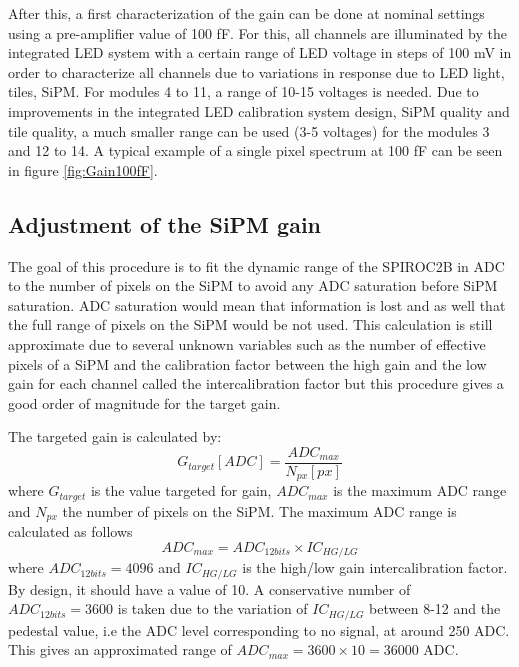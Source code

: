 After this, a first characterization of the gain can be done at nominal settings using a pre-amplifier value of 100 fF. For this, all channels are illuminated by the integrated LED system with a certain range of LED voltage in steps of 100 mV in order to characterize all channels due to variations in response due to LED light, tiles, SiPM. For modules 4 to 11, a range of 10-15 voltages is needed. Due to improvements in the integrated LED calibration system design, SiPM quality and tile quality, a much smaller range can be used (3-5 voltages) for the modules 3 and 12 to 14. A typical example of a single pixel spectrum at 100 fF can be seen in figure \ref{fig:Gain100fF}.

\subsection{Adjustment of the SiPM gain}
\label{sec:AdjustGain}

The goal of this procedure is to fit the dynamic range of the SPIROC2B in ADC to the number of pixels on the SiPM to avoid any ADC saturation before SiPM saturation. ADC saturation would mean that information is lost and as well that the full range of pixels on the SiPM would be not used. This calculation is still approximate due to several unknown variables such as the number of effective pixels of a SiPM and the calibration factor between the high gain and the low gain for each channel called the intercalibration factor but this procedure gives a good order of magnitude for the target gain.

The targeted gain is calculated by:
\begin{equation}
  G_{target} [ADC] = \frac{ADC_{max}}{N_{px} [px]} \label{eq:GainTarget}
\end{equation}
where $G_{target}$ is the value targeted for gain, $ADC_{max}$ is the maximum ADC range and $N_{px}$ the number of pixels on the SiPM. The maximum ADC range is calculated as follows
\begin{equation}
  ADC_{max} = ADC_{12 bits} \times IC_{HG/LG}
\end{equation}
where $ADC_{12 bits} = 4096$ and $IC_{HG/LG}$ is the high/low gain intercalibration factor. By design, it should have a value of 10. A conservative number of $ADC_{12 bits} = 3600$ is taken due to the variation of $IC_{HG/LG}$ between 8-12 and the pedestal value, i.e the ADC level corresponding to no signal, at around 250 ADC. This gives an approximated range of $ADC_{max} = 3600 \times 10 = 36 000$ ADC.

